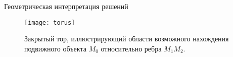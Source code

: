 \documentclass[russian,hyperref={unicode}]{beamer}
\begin{document}
  \begin{frame}{Геометрическая интерпретация решений}
    \begin{center}
      \begin{figure}
        \texttt{[image: torus]}
        \caption{Закрытый тор, иллюстрирующий области возможного нахождения подвижного объекта $M_0$ относительно ребра $M_1M_2$.}
      \end{figure}
    \end{center}
  \end{frame}
\end{document}
